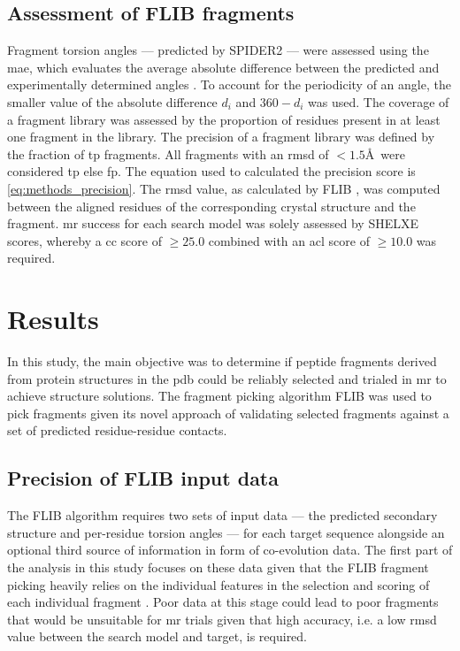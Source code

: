 \subsection{Assessment of FLIB fragments}
Fragment torsion angles --- predicted by SPIDER2 \cite{Heffernan2015-wp} --- were assessed using the \gls{mae}, which evaluates the average absolute difference between the predicted and experimentally determined angles \cite{Heffernan2015-wp}. To account for the periodicity of an angle, the smaller value of the absolute difference $d_i$ and $360-d_i$ was used. The coverage of a fragment library was assessed by the proportion of residues present in at least one fragment in the library. The precision of a fragment library was defined by the fraction of \gls{tp} fragments. All fragments with an \gls{rmsd} of $<1.5$\AA\ were considered \gls{tp} else \gls{fp}. The equation used to calculated the precision score is \cref{eq:methods_precision}. The \gls{rmsd} value, as calculated by FLIB \cite{De_Oliveira2015-ba}, was computed between the aligned residues of the corresponding crystal structure and the fragment. \Gls{mr} success for each search model was solely assessed by SHELXE scores, whereby a \gls{cc} score of $\geq25.0$ combined with an \gls{acl} score of $\geq10.0$ was required.

\section{Results}
In this study, the main objective was to determine if peptide fragments derived from protein structures in the \gls{pdb} could be reliably selected and trialed in \gls{mr} to achieve structure solutions. The fragment picking algorithm FLIB \cite{De_Oliveira2015-ba} was used to pick fragments given its novel approach of validating selected fragments against a set of predicted residue-residue contacts.

\subsection{Precision of FLIB input data}
The FLIB algorithm requires two sets of input data --- the predicted secondary structure and per-residue torsion angles --- for each target sequence alongside an optional third source of information in form of co-evolution data. The first part of the analysis in this study focuses on these data given that the FLIB fragment picking heavily relies on the individual features in the selection and scoring of each individual fragment \cite{De_Oliveira2015-ba}. Poor data at this stage could lead to poor fragments that would be unsuitable for \gls{mr} trials given that high accuracy, i.e. a low \gls{rmsd} value between the search model and target, is required.


